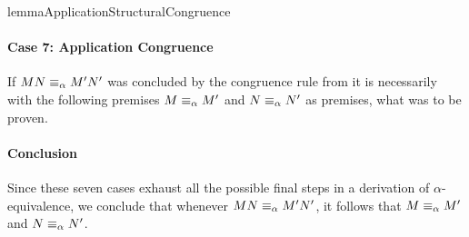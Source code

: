 \begin{longproof}{lemmaApplicationStructuralCongruence}
\paragraph{Case 7: Application Congruence}
If $MN \equiv_\alpha M'N'$ was concluded by the congruence rule from it is necessarily with the following premises $M \equiv_\alpha M'$ and $N \equiv_\alpha N'$ as premises, what was to be proven.

\paragraph{Conclusion}
Since these seven cases exhaust all the possible final steps in a derivation 
of $\alpha$-equivalence, we conclude that whenever $M N \equiv_\alpha M' N'$, it 
follows that $M \equiv_\alpha M'$ and $N \equiv_\alpha N'$.
\end{longproof}


%
%

